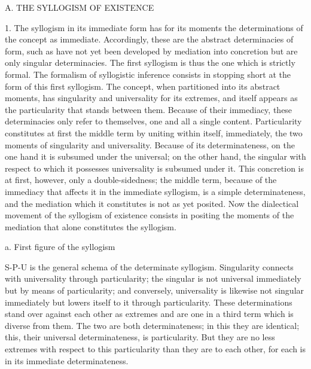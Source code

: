 
A. THE SYLLOGISM OF EXISTENCE

1. The syllogism in its immediate form
has for its moments the determinations
of the concept as immediate.
Accordingly, these are the abstract determinacies of form,
such as have not yet been developed by mediation into concretion
but are only singular determinacies.
The first syllogism is thus the one which is strictly formal.
The formalism of syllogistic inference consists in
stopping short at the form of this first syllogism.
The concept, when partitioned into its abstract moments,
has singularity and universality for its extremes,
and itself appears as the particularity
that stands between them.
Because of their immediacy,
these determinacies only refer to themselves,
one and all a single content.
Particularity constitutes at first the middle term
by uniting within itself, immediately,
the two moments of singularity and universality.
Because of its determinateness,
on the one hand it is subsumed under the universal;
on the other hand, the singular
with respect to which it possesses universality
is subsumed under it.
This concretion is at first, however,
only a double-sidedness;
the middle term, because of the immediacy
that affects it in the immediate syllogism,
is a simple determinateness,
and the mediation which it constitutes is not as yet posited.
Now the dialectical movement of the syllogism of existence
consists in positing the moments of the mediation
that alone constitutes the syllogism.

a. First figure of the syllogism

S-P-U is the general schema of the determinate syllogism.
Singularity connects with universality through particularity;
the singular is not universal immediately
but by means of particularity;
and conversely, universality is likewise not singular immediately
but lowers itself to it through particularity.
These determinations stand over against each other as extremes
and are one in a third term which is diverse from them.
The two are both determinateness;
in this they are identical;
this, their universal determinateness, is particularity.
But they are no less extremes with respect to
this particularity than they are to each other,
for each is in its immediate determinateness.

